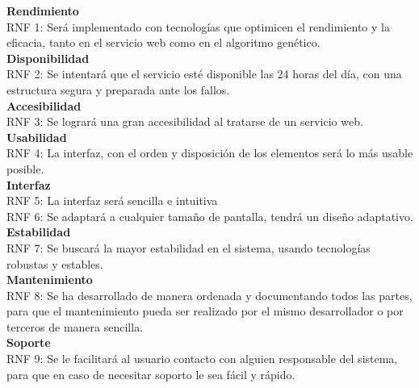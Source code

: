 \bigskip
\textbf{Rendimiento}\\

RNF 1: Será implementado con tecnologías que optimicen el rendimiento y la eficacia, tanto en el servicio web como en el algoritmo genético.\\

\textbf{Disponibilidad}\\

RNF 2: Se intentará que el servicio esté disponible las 24 horas del día, con una estructura segura y preparada ante los fallos.\\


\textbf{Accesibilidad}\\

RNF 3: Se logrará una gran accesibilidad al tratarse de un servicio web.\\


\textbf{Usabilidad}\\

RNF 4: La interfaz, con el orden y disposición de los elementos será lo más usable posible.\\

\textbf{Interfaz}\\

RNF 5: La interfaz será sencilla e intuitiva\\

RNF 6: Se adaptará a cualquier tamaño de pantalla, tendrá un diseño adaptativo.\\


\textbf{Estabilidad}\\

RNF 7: Se buscará la mayor estabilidad en el sistema, usando tecnologías robustas y estables.\\


\textbf{Mantenimiento}\\

RNF 8: Se ha desarrollado de manera ordenada y documentando todos las partes, para que el mantenimiento pueda ser realizado por el mismo desarrollador o por terceros de manera sencilla.\\


\textbf{Soporte}\\

RNF 9: Se le facilitará al usuario contacto con alguien responsable del sistema, para que en caso de necesitar soporto le sea fácil y rápido.\\



